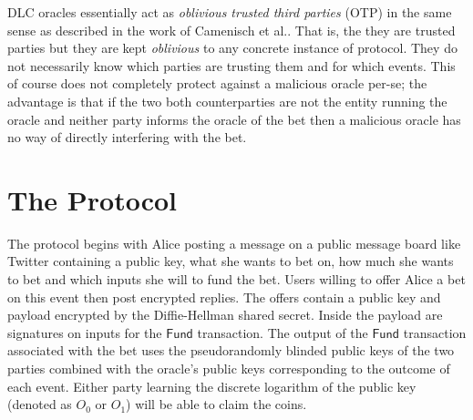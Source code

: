 \documentclass{article}
\theoremstyle{definition}
\begin{document}
DLC oracles essentially act as \textit{oblivious trusted third parties} (OTP) in the same sense as described in the work of Camenisch et al.\cite{cryptoeprint:2011:319}. That is, the they are trusted parties but they are kept \emph{oblivious} to any concrete instance of protocol. They do not necessarily know which parties are trusting them and for which events. This of course does not completely protect against a malicious oracle per-se; the advantage is that if the two both counterparties are not the entity running the oracle and neither party informs the oracle of the bet then a malicious oracle has no way of directly interfering with the bet.



\section{The Protocol}
\newcommand{\Rec}{\textsf{Rec}}
\newcommand{\bet}{\textsf{bet}}
\newcommand{\hatsigma}{\hat{\sigma}}
\newcommand{\Fund}{\textsf{Fund}}
\newcommand{\Outcome}{\textsf{Outcome}}
\newcommand{\KeyGen}{\textsf{KeyGen}}
\newcommand{\win}{\textsf{win}}
\newcommand{\Verify}{\textsf{Vrfy}}
\newcommand{\Tx}{\textsf{Tx}}
\newcommand{\EncVer}{\textsf{EncVrfy}}
\newcommand{\Pdleq}{\pcalgostyle{P}_{\textsf{DLEQ}}}
\newcommand{\Vdleq}{\pcalgostyle{V}_{\textsf{DLEQ}}}
\newcommand{\change}{\textsf{change}}
\newcommand{\val}{\textsf{val}}
\newcommand{\OPCHECKMULTISIG}{\texttt{CHECKMULTISIG}_{\text{1-of-2}}}
\newcommand{\fee}{\textsf{fee}}
\newcommand{\Sign}{\textsf{Sign}}
\newcommand{\EncSign}{\textsf{EncSign}}
\newcommand{\Rx}{R_\texttt{x}}
\newcommand{\DecSig}{\textsf{DecSig}}
\newcommand{\TxGen}{\textsf{TxGen}}
\newcommand{\eventid}{\textsf{event\_id}}
\newcommand{\PRG}{\textsf{PRG}}
\newcommand{\HKDF}{H_{\textsf{KDF}}}

The protocol begins with Alice posting a message on a public message board like Twitter containing a public key, what she wants to bet on, how much she wants to bet and which inputs she will to fund the bet. Users willing to offer Alice a bet on this event then post encrypted replies. The offers contain a public key and payload encrypted by the Diffie-Hellman shared secret. Inside the payload are signatures on inputs for the $\Fund$ transaction. The output of the $\Fund$ transaction associated with the bet uses the pseudorandomly blinded public keys of the two parties combined with the oracle's public keys corresponding to the outcome of each event. Either party learning the discrete logarithm of the public key (denoted as $O_0$ or $O_1$) will be able to claim the coins.
\end{document}
